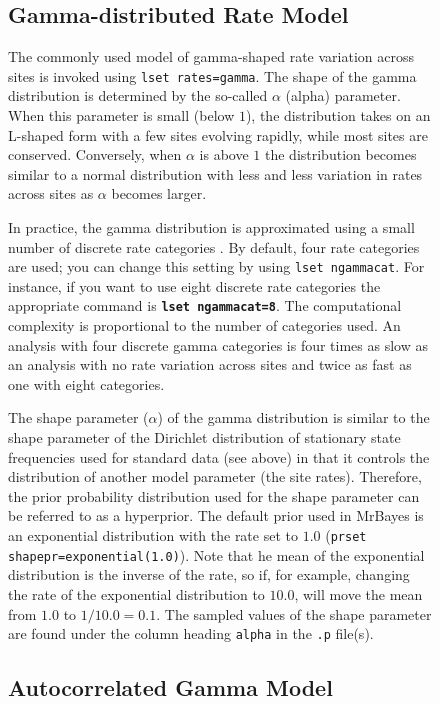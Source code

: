 \documentclass[12pt]{book}
\newcommand{\ttt}[1]{\texttt{#1}}
\newcommand{\tb}[1]{\ttt{\textbf{#1}}}
\begin{document}
\begin{figure}[h]
\subsection{Gamma-distributed Rate Model}
\label{gammaDistributedRateModel}

The commonly used model of gamma-shaped rate variation across sites is invoked using \ttt{lset
rates=gamma}. The shape of the gamma distribution is determined by the so-called $\alpha$ (alpha)
parameter. When this parameter is small (below $1$), the distribution takes on an L-shaped form
with a few sites evolving rapidly, while most sites are conserved. Conversely, when $\alpha$ is
above $1$ the distribution becomes similar to a normal distribution with less and less variation in
rates across sites as $\alpha$ becomes larger.

In practice, the gamma distribution is approximated using a small number of discrete rate
categories \citep{yang94a}. By default, four rate categories are used; you can change this setting
by using \ttt{lset ngammacat}. For instance, if you want to use eight discrete rate categories the
appropriate command is \tb{lset ngammacat=8}. The computational complexity is proportional to the
number of categories used. An analysis with four discrete gamma categories is four times as slow as
an analysis with no rate variation across sites and twice as fast as one with eight categories.

The shape parameter ($\alpha$) of the gamma distribution is similar to the shape parameter of the
Dirichlet distribution of stationary state frequencies used for standard data (see above) in that
it controls the distribution of another model parameter (the site rates). Therefore, the prior
probability distribution used for the shape parameter can be referred to as a hyperprior. The
default prior used in MrBayes is an exponential distribution with the rate set to $1.0$ (\ttt{prset
shapepr=exponential(1.0)}). Note that he mean of the exponential distribution is the inverse of the
rate, so if, for example, changing the rate of the exponential distribution to $10.0$, will move
the mean from $1.0$ to $1/10.0 = 0.1$. The sampled values of the shape parameter are found under
the column heading \ttt{alpha} in the \ttt{.p} file(s).

\subsection{Autocorrelated Gamma Model}


\end{figure}
\end{document}
